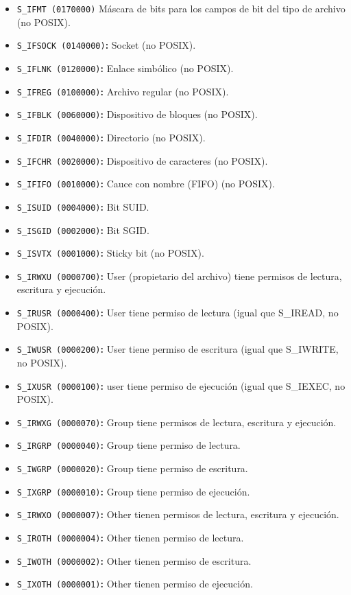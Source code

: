 \begin{itemize}
	\item\texttt{S\_IFMT (0170000)} Máscara de bits para los campos de bit del tipo de archivo (no POSIX).
	\item\texttt{S\_IFSOCK (0140000)}\textbf{:} Socket (no POSIX).
	\item\texttt{S\_IFLNK (0120000)}\textbf{:} Enlace simbólico (no POSIX).
	\item\texttt{S\_IFREG (0100000)}\textbf{:} Archivo regular (no POSIX).
	\item\texttt{S\_IFBLK (0060000)}\textbf{:} Dispositivo de bloques (no POSIX).
	\item\texttt{S\_IFDIR (0040000)}\textbf{:} Directorio (no POSIX).
	\item\texttt{S\_IFCHR (0020000)}\textbf{:} Dispositivo de caracteres (no POSIX).
	\item\texttt{S\_IFIFO (0010000)}\textbf{:} Cauce con nombre (FIFO) (no POSIX).
	\item\texttt{S\_ISUID (0004000)}\textbf{:} Bit SUID\@.
	\item\texttt{S\_ISGID (0002000)}\textbf{:} Bit SGID\@.
	\item\texttt{S\_ISVTX (0001000)}\textbf{:} Sticky bit (no POSIX).
	\item\texttt{S\_IRWXU (0000700)}\textbf{:} User (propietario del archivo) tiene permisos de lectura, escritura y  ejecución.
	\item\texttt{S\_IRUSR (0000400)}\textbf{:} User tiene permiso de lectura (igual que S\_IREAD, no POSIX).
	\item\texttt{S\_IWUSR (0000200)}\textbf{:} User tiene permiso de escritura (igual que S\_IWRITE, no POSIX).
	\item\texttt{S\_IXUSR (0000100)}\textbf{:} user tiene permiso de ejecución (igual que S\_IEXEC, no POSIX).
	\item\texttt{S\_IRWXG (0000070)}\textbf{:} Group tiene permisos de lectura, escritura y ejecución.
	\item\texttt{S\_IRGRP (0000040)}\textbf{:} Group tiene permiso de lectura.
	\item\texttt{S\_IWGRP (0000020)}\textbf{:} Group tiene permiso de escritura.
	\item\texttt{S\_IXGRP (0000010)}\textbf{:} Group tiene permiso de ejecución.
	\item\texttt{S\_IRWXO (0000007)}\textbf{:} Other tienen permisos de lectura, escritura y ejecución.
	\item\texttt{S\_IROTH (0000004)}\textbf{:} Other tienen permiso de lectura.
	\item\texttt{S\_IWOTH (0000002)}\textbf{:} Other tienen permiso de escritura.
	\item\texttt{S\_IXOTH (0000001)}\textbf{:} Other tienen permiso de ejecución.
\end{itemize}

